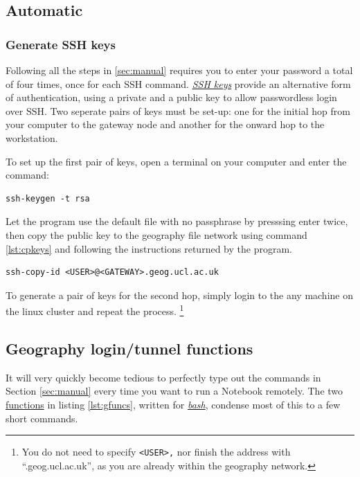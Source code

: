 \documentclass[a4paper]{article}
\begin{document}
\subsection{Automatic}
\label{sec:auto}

\subsubsection{Generate SSH keys}
\label{sec:sshkeys}
Following all the steps in \ref{sec:manual} requires you to enter your password a total of four times, once for each SSH command.
\href{https://wiki.archlinux.org/index.php/SSH_keys}{\emph{SSH keys}} provide an alternative form of authentication, using a private and a public key to allow passwordless login over SSH.
Two seperate pairs of keys must be set-up: one for the initial hop from your computer to the gateway node and another for the onward hop to the workstation.

To set up the first pair of keys, open a terminal on your computer and enter the command:
\begin{lstlisting}[caption={Generate SSH keys}, label={lst:genkeys}]
ssh-keygen -t rsa
\end{lstlisting}
Let the program use the default file with no passphrase by presssing enter twice, then copy the public key to the geography file network using command \ref{lst:cpkeys} and following the instructions returned by the program.

\begin{lstlisting}[caption={Copy public key to geography file system}, label={lst:cpkeys}]
ssh-copy-id <USER>@<GATEWAY>.geog.ucl.ac.uk
\end{lstlisting}

To generate a pair of keys for the second hop, simply login to the any machine on the linux cluster and repeat the process.
\footnote{You do not need to specify \texttt{\textless{}USER\textgreater{},} nor finish the address with ``.geog.ucl.ac.uk'', as you are already within the geography network.}

\subsection{Geography login/tunnel functions}
\label{sec:gfuncs}

It will very quickly become tedious to perfectly type out the commands in Section \ref{sec:manual} every time you want to run a Notebook remotely.
The two \href{https://www.shellscript.sh/functions.html}{functions} in listing \ref{lst:gfuncs}, written for \href{http://cs.lmu.edu/~ray/notes/bash/}{\emph{bash}}, condense most of this to a few short commands.
\end{document}

